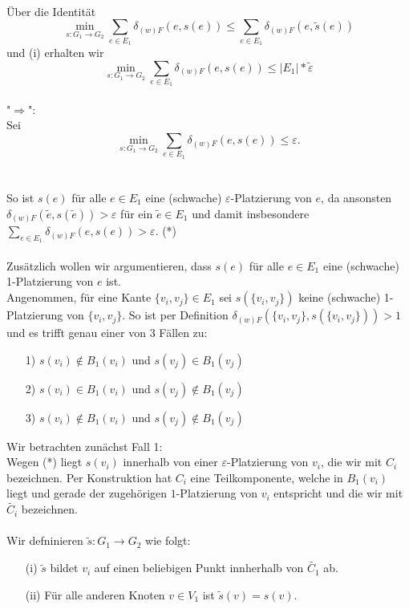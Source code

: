 \documentclass[a4paper, 12pt, twoside]{article}
\theoremstyle{Format1} %
\begin{document}
\\
Über die Identität $$\min_{s: G_1 \to G_2} \sum_{e \in E_1} \delta_{(w)F}(e, s(e)) \leq \sum_{e \in E_1} \delta_{(w)F}(e,\tilde{s}(e)) $$
und (i) erhalten wir
$$\min_{s: G_1 \to G_2} \sum_{e \in E_1} \delta_{(w)F}(e, s(e)) \leq |E_1| * \tilde{\varepsilon}$$
\\
"$\Rightarrow$":
\\
Sei $$\min_{s: G_1 \to G_2} \sum_{e \in E_1} \delta_{(w)F}(e, s(e)) \leq {\varepsilon}.$$
\\
\\
So ist $s(e)$ für alle $e \in E_1$ eine (schwache) $\varepsilon$-Platzierung von $e$,
da ansonsten $\delta_{(w)F}(\tilde{e}, s(\tilde{e})) > \varepsilon$ für ein $\tilde{e} \in E_1$ und damit insbesondere $\sum_{{e}\in E_1} \delta_{(w)F}(e, s(e)) > \varepsilon$.
(*)
\\
\\
Zusätzlich wollen wir argumentieren, dass $s(e)$ für alle $e \in E_1$ eine (schwache) 1-Platzierung von $e$ ist.
\\
Angenommen, für eine Kante $\{v_i,v_j\} \in E_1$ sei $s(\{v_i, v_j\})$ keine (schwache) 1-Platzierung von $\{v_i,v_j\}$.
So ist per Definition $\delta_{(w)F}(\{v_i,v_j\}, s(\{v_i, v_j\})) > 1$
und es trifft genau einer von 3 Fällen zu:

\begin{enumerate}
	\item[1)] $s(v_i) \notin B_1(v_i)$ und $s(v_j) \in B_1(v_j)$
	\item[2)] $s(v_i) \in B_1(v_i)$ und $s(v_j) \notin B_1(v_j)$
	\item[3)] $s(v_i) \notin B_1(v_i)$ und $s(v_j) \notin B_1(v_j)$
\end{enumerate}

Wir betrachten zunächst Fall 1:
\\
Wegen (*) liegt $s(v_i)$ innerhalb von  einer $\varepsilon$-Platzierung von $v_i$, die wir mit $C_i$ bezeichnen.
Per Konstruktion hat $C_i$ eine Teilkomponente, welche in $B_1(v_i)$ liegt und gerade der zugehörigen $1$-Platzierung von $v_i$ entspricht und die wir mit $\tilde{C_i}$ bezeichnen.
\\
\\
Wir defninieren $\tilde{s}: G_1 \rightarrow G_2$ wie folgt:
\begin{enumerate}
	\item[(i)] $\tilde{s}$ bildet $v_i$ auf einen beliebigen Punkt innherhalb von $\tilde{C_1}$ ab.
	\item[(ii)] Für alle anderen Knoten $v \in V_1$ ist $\tilde{s}(v)=s(v)$.
\end{enumerate}
\end{document}
